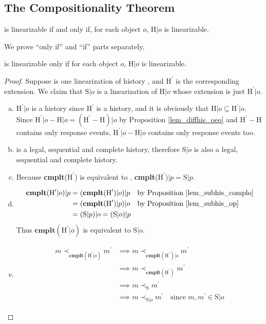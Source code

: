 \documentclass[a4paper,USenglish]{lipics-v2016}
\newcommand{\linb}{linearizable}
\newcommand{\linz}{linearization}
\newcommand{\cmplt}{\textbf{cmplt}}
\newcommand{\his}{\text{H}}
\newcommand{\shis}{\text{S}}
\newcommand{\myvert}{\vert}
\begin{document}
\subsection{The Compositionality Theorem}\label{comp_thm}

\begin{theorem}\label{thm_lin}
	{\his} is {\linb} if and only if, for each object $o$, $\his \myvert o$ is {\linb}.
\end{theorem}

We prove ``only if'' and ``if'' parts separately.

\begin{lemma}\label{lemma_lin_onlyif}
	{\his} is {\linb} only if for each object $o$, $\his \myvert o$ is {\linb}.
\end{lemma}
\begin{proof}
	Suppose {\shis} is one {\linz} of history {\his}, and $\his^\prime$ is the corresponding extension.
	We claim that $\shis \myvert o$ is a {\linz} of $\his \myvert o$ whose extension is just $\his^\prime \myvert o$.
	\begin{enumerate}[(a)]
		\item
		$\his^\prime \myvert o$ is a history since $\his^\prime$ is a history, and it is obviously that $\his \myvert o \subseteq \his^\prime \myvert o$.
		Since $\his^\prime \myvert o - \his \myvert o = (\his^\prime - \his) \myvert o$ by Proposition \ref{lem_diffhis_oeq} and $\his^\prime - \his$ contains only response events, $\his^\prime \myvert o - \his \myvert o$ contains only response events too.
		\item
		{\shis} is a legal, sequential and complete history, therefore $\shis \myvert o$ is also a legal, sequential and complete history.
		\item
		Because \cmplt($\his^\prime$) is equivalent to {\shis},
		\cmplt($\his^\prime$)$\myvert p = \shis \myvert p$.
		\item
		\begin{align*}
		\cmplt(\his^\prime \myvert o) \myvert p &= (\cmplt(\his^\prime) \myvert o) \myvert p \quad \text{by Proposition \ref{lem_subhis_complo}}\\
		&= (\cmplt(\his^\prime) \myvert p) \myvert o \quad \text{by Proposition \ref{lem_subhis_op}}\\
		&= (\shis \myvert p) \myvert o = (\shis \myvert o) \myvert p
		\end{align*}
		Thus $\cmplt(\his^\prime \myvert o)$ is equivalent to $\shis \myvert o$.
		\item
		\begin{align*}
		m \prec_{\cmplt(\his^\prime \myvert o)} m^\prime &\implies m \prec_{\cmplt(\his^\prime) \myvert o} m^\prime\\
		&\implies m \prec_{\cmplt(\his^\prime)} m^\prime\\
		&\implies m \prec_{\shis} m^\prime\\
		&\implies m \prec_{\shis \myvert o} m^\prime \quad \text{since } m, m^\prime \in \shis \myvert o
		\end{align*}
	\end{enumerate}
\end{proof}
\end{document}
